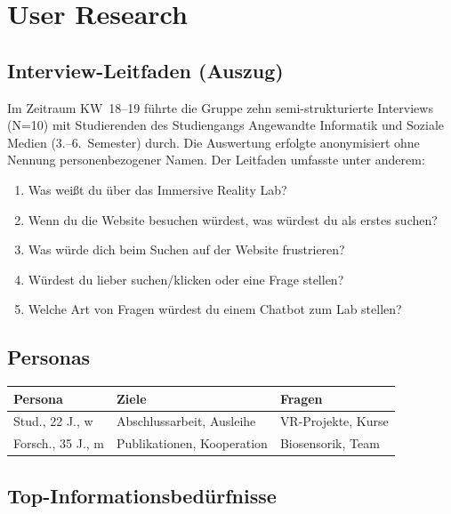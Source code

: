 \appendix
\section{User Research}
\label{app:user-research}

\subsection{Interview-Leitfaden (Auszug)}

Im Zeitraum KW~18--19 führte die Gruppe zehn semi-strukturierte Interviews (N=10) mit Studierenden des Studiengangs Angewandte Informatik und Soziale Medien (3.--6.~Semester) durch. Die Auswertung erfolgte anonymisiert ohne Nennung personenbezogener Namen. Der Leitfaden umfasste unter anderem:

\begin{enumerate}
    \item Was weißt du über das Immersive Reality Lab?
    \item Wenn du die Website besuchen würdest, was würdest du als erstes suchen?
    \item Was würde dich beim Suchen auf der Website frustrieren?
    \item Würdest du lieber suchen/klicken oder eine Frage stellen?
    \item Welche Art von Fragen würdest du einem Chatbot zum Lab stellen?
\end{enumerate}

\subsection{Personas}

\begin{tabularx}{\textwidth}{@{}l X X@{}}
\toprule
\textbf{Persona} & \textbf{Ziele} & \textbf{Fragen} \\
\midrule
Stud., 22 J., w & Abschlussarbeit, Ausleihe & VR-Projekte, Kurse \\
Forsch., 35 J., m & Publikationen, Kooperation & Biosensorik, Team \\
\bottomrule
\end{tabularx}

\subsection{Top-Informationsbedürfnisse}

